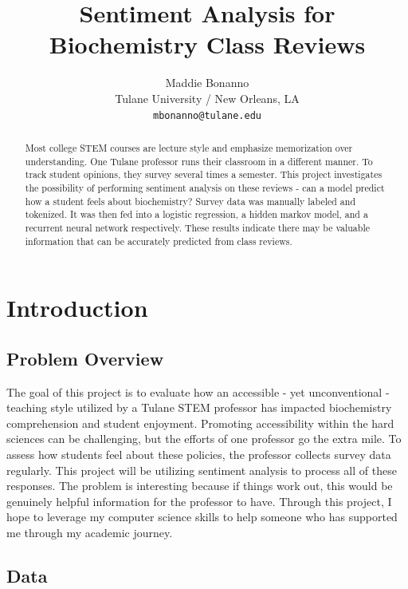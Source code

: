 \documentclass[11pt,a4paper]{article}
\title{Sentiment Analysis for Biochemistry Class Reviews}
\author{Maddie Bonanno \\
  Tulane University / New Orleans, LA \\
  \texttt{mbonanno@tulane.edu} }
\date{}
\begin{document}
\maketitle

\begin{abstract}
Most college STEM courses are lecture style and emphasize memorization over understanding. One Tulane professor runs their classroom in a different manner. To track student opinions, they survey several times a semester. This project investigates the possibility of performing sentiment analysis on these reviews -  can a model predict how a student feels about biochemistry? Survey data was manually labeled and tokenized. It was then fed into a logistic regression, a hidden markov model, and a recurrent neural network respectively. These results indicate there may be valuable information that can be accurately predicted from class reviews.


\end{abstract}



\section{Introduction}




\subsection{Problem Overview}

The goal of this project is to evaluate how an accessible - yet unconventional - teaching style utilized by a Tulane STEM professor has impacted biochemistry comprehension and student enjoyment. Promoting accessibility within the hard sciences can be challenging, but the efforts of one professor go the extra mile. To assess how students feel about these policies, the professor collects survey data regularly. This project will be utilizing sentiment analysis to process all of these responses. The problem is interesting because if things work out, this would be genuinely helpful information for the professor to have. Through this project, I hope to leverage my computer science skills to help someone who has supported me through my academic journey.

\subsection{Data}
\end{document}
